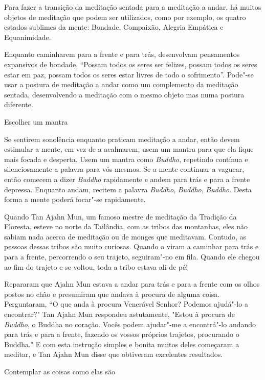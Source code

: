 Para fazer a transição da meditação sentada para a meditação a andar, há
muitos objetos de meditação que podem ser utilizados, como por exemplo,
os quatro estados sublimes da mente: Bondade, Compaixão, Alegria
Empática e Equanimidade.

Enquanto caminharem para a frente e para trás, desenvolvam pensamentos
expansivos de bondade, ``Possam todos os seres ser felizes, possam todos
os seres estar em paz, possam todos os seres estar livres de todo o
sofrimento''. Pode"-se usar a postura de meditação a andar como um
complemento da meditação sentada, desenvolvendo a meditação com o mesmo
objeto mas numa postura diferente.

\begin{siderule-quote}
  Escolher um mantra
\end{siderule-quote}

Se sentirem sonolência enquanto praticam meditação a andar, então devem
estimular a mente, em vez de a acalmarem, usem um mantra para que ela
fique mais focada e desperta. Usem um mantra como \emph{Buddho},
repetindo contínua e silenciosamente a palavra para vós mesmos. Se a
mente continuar a vaguear, então comecem a dizer \emph{Buddho}
rapidamente e andem para trás e para a frente depressa. Enquanto andam,
recitem a palavra \emph{Buddho}, \emph{Buddho}, \emph{Buddho}. Desta
forma a mente poderá focar"-se rapidamente.

Quando Tan Ajahn Mun, um famoso mestre de meditação da Tradição
da Floresta, esteve no norte da Tailândia, com as tribos das montanhas,
eles não sabiam nada acerca de meditação ou de monges que meditavam.
Contudo, as pessoas dessas tribos são muito curiosas. Quando o viram a
caminhar para trás e para a frente, percorrendo o seu trajeto,
seguiram"-no em fila. Quando ele chegou ao fim do trajeto e se voltou,
toda a tribo estava ali de pé!

Repararam que Ajahn Mun estava a andar para trás e para a frente
com os olhos postos no chão e presumiram que andava à procura de alguma
coisa. Perguntaram, ``O que anda à procura Venerável Senhor? Podemos
ajudá"-lo a encontrar?" Tan Ajahn Mun respondeu astutamente,
"Estou à procura de \emph{Buddho}, o Buddha no coração. Vocês
podem ajudar"-me a encontrá"-lo andando para trás e para a frente, fazendo
os vossos próprios trajetos, procurando o Buddha." E com esta
instrução simples e bonita muitos deles começaram a meditar, e Tan
Ajahn Mun disse que obtiveram excelentes resultados.

\begin{siderule-quote}
  Contemplar as coisas como elas são
\end{siderule-quote}

